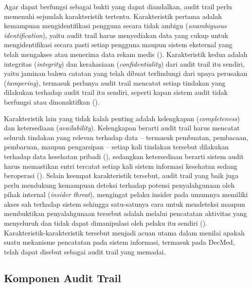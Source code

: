 Agar dapat berfungsi sebagai bukti yang dapat diandalkan, audit trail perlu memenuhi sejumlah karakteristik tertentu. Karakteristik pertama adalah kemampuan mengidentifikasi pengguna secara tidak ambigu (\textit{unambiguous identification}), yaitu audit trail harus menyediakan data yang cukup untuk mengidentifikasi secara pasti setiap pengguna maupun sistem eksternal yang telah mengakses atau menerima data rekam medis (\cite{iso27789_2021}). Karakteristik kedua adalah integritas (\textit{integrity}) dan kerahasiaan (\textit{confidentiality}) dari audit trail itu sendiri, yaitu jaminan bahwa catatan yang telah dibuat terlindungi dari upaya perusakan (\textit{tampering}), termasuk perlunya audit trail mencatat setiap tindakan yang dilakukan terhadap audit trail itu sendiri, seperti kapan sistem audit tidak berfungsi atau dinonaktifkan (\cite{iso27789_2021}).

Karakteristik lain yang tidak kalah penting adalah kelengkapan (\textit{completeness}) dan ketersediaan (\textit{availability}). Kelengkapan berarti audit trail harus mencatat seluruh tindakan yang relevan terhadap data -- termasuk pembuatan, pembacaan, pembaruan, maupun pengarsipan -- setiap kali tindakan tersebut dilakukan terhadap data kesehatan pribadi (\cite{iso27789_2021}), sedangkan ketersediaan berarti sistem audit harus memastikan entri tercatat setiap kali sistem informasi kesehatan sedang beroperasi (\cite{iso27789_2021}). Selain keempat karakteristik tersebut, audit trail yang baik juga perlu mendukung kemampuan deteksi terhadap potensi penyalahgunaan oleh pihak internal (\textit{insider threat}), mengingat pelaku insider pada umumnya memiliki akses sah terhadap sistem sehingga satu-satunya cara untuk mendeteksi maupun membuktikan penyalahgunaan tersebut adalah melalui pencatatan aktivitas yang menyeluruh dan tidak dapat dimanipulasi oleh pelaku itu sendiri (\cite{cert2022insiderthreat}). Karakteristik-karakteristik tersebut menjadi acuan utama dalam menilai apakah suatu mekanisme pencatatan pada sistem informasi, termasuk pada DecMed, telah dapat disebut sebagai audit trail yang memadai.

\subsection{Komponen Audit Trail}
\label{subsec:komponen-audit-trail}

